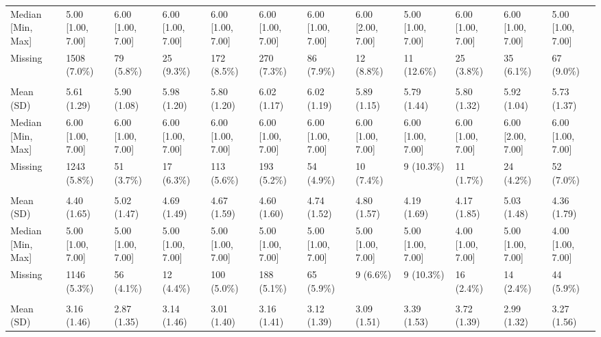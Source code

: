 \documentclass[
  single column]{article}
\begin{document}
\begin{landscape}
\begin{tabular}[t]{llllllllllll}
\hspace{1em}Median [Min, Max] & 5.00 [1.00, 7.00] & 6.00 [1.00, 7.00] & 6.00 [1.00, 7.00] & 6.00 [1.00, 7.00] & 6.00 [1.00, 7.00] & 6.00 [1.00, 7.00] & 6.00 [2.00, 7.00] & 5.00 [1.00, 7.00] & 6.00 [1.00, 7.00] & 6.00 [1.00, 7.00] & 5.00 [1.00, 7.00]\\
\hspace{1em}Missing & 1508 (7.0\%) & 79 (5.8\%) & 25 (9.3\%) & 172 (8.5\%) & 270 (7.3\%) & 86 (7.9\%) & 12 (8.8\%) & 11 (12.6\%) & 25 (3.8\%) & 35 (6.1\%) & 67 (9.0\%)\\
\addlinespace[0.3em]
\multicolumn{12}{l}{\textbf{meaning\_sense}}\\
\hspace{1em}Mean (SD) & 5.61 (1.29) & 5.90 (1.08) & 5.98 (1.20) & 5.80 (1.20) & 6.02 (1.17) & 6.02 (1.19) & 5.89 (1.15) & 5.79 (1.44) & 5.80 (1.32) & 5.92 (1.04) & 5.73 (1.37)\\
\hspace{1em}Median [Min, Max] & 6.00 [1.00, 7.00] & 6.00 [1.00, 7.00] & 6.00 [1.00, 7.00] & 6.00 [1.00, 7.00] & 6.00 [1.00, 7.00] & 6.00 [1.00, 7.00] & 6.00 [1.00, 7.00] & 6.00 [1.00, 7.00] & 6.00 [1.00, 7.00] & 6.00 [2.00, 7.00] & 6.00 [1.00, 7.00]\\
\hspace{1em}Missing & 1243 (5.8\%) & 51 (3.7\%) & 17 (6.3\%) & 113 (5.6\%) & 193 (5.2\%) & 54 (4.9\%) & 10 (7.4\%) & 9 (10.3\%) & 11 (1.7\%) & 24 (4.2\%) & 52 (7.0\%)\\
\addlinespace[0.3em]
\multicolumn{12}{l}{\textbf{neighbourhood\_community}}\\
\hspace{1em}Mean (SD) & 4.40 (1.65) & 5.02 (1.47) & 4.69 (1.49) & 4.67 (1.59) & 4.60 (1.60) & 4.74 (1.52) & 4.80 (1.57) & 4.19 (1.69) & 4.17 (1.85) & 5.03 (1.48) & 4.36 (1.79)\\
\hspace{1em}Median [Min, Max] & 5.00 [1.00, 7.00] & 5.00 [1.00, 7.00] & 5.00 [1.00, 7.00] & 5.00 [1.00, 7.00] & 5.00 [1.00, 7.00] & 5.00 [1.00, 7.00] & 5.00 [1.00, 7.00] & 5.00 [1.00, 7.00] & 4.00 [1.00, 7.00] & 5.00 [1.00, 7.00] & 4.00 [1.00, 7.00]\\
\hspace{1em}Missing & 1146 (5.3\%) & 56 (4.1\%) & 12 (4.4\%) & 100 (5.0\%) & 188 (5.1\%) & 65 (5.9\%) & 9 (6.6\%) & 9 (10.3\%) & 16 (2.4\%) & 14 (2.4\%) & 44 (5.9\%)\\
\addlinespace[0.3em]
\multicolumn{12}{l}{\textbf{perfectionism}}\\
\hspace{1em}Mean (SD) & 3.16 (1.46) & 2.87 (1.35) & 3.14 (1.46) & 3.01 (1.40) & 3.16 (1.41) & 3.12 (1.39) & 3.09 (1.51) & 3.39 (1.53) & 3.72 (1.39) & 2.99 (1.32) & 3.27 (1.56)\\

\end{tabular}
\end{landscape}
\end{document}
